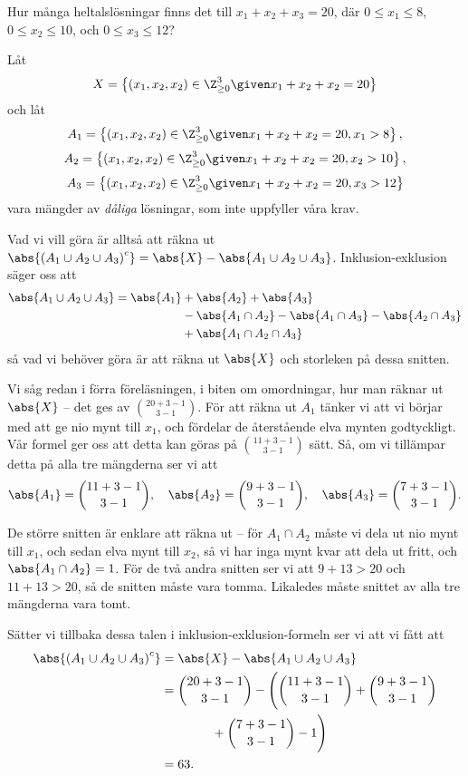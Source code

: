 \documentclass[nobib]{tufte-handout}
\begin{document}
\begin{example}
  Hur många heltalslösningar finns det till $x_1 + x_2 + x_3 = 20$, där $0 \leq x_1 \leq 8$, $0 \leq x_2 \leq 10$, och $0 \leq x_3 \leq 12$?

  Låt
  $$X = \left\{(x_1, x_2, x_2) \in \Z_{\geq 0}^3 \given x_1 + x_2 + x_2 = 20\right\}$$
  och låt
  $$A_1 = \left\{(x_1, x_2, x_2) \in \Z_{\geq 0}^3 \given x_1 + x_2 + x_2 = 20, x_1 > 8\right\},$$
  $$A_2 = \left\{(x_1, x_2, x_2) \in \Z_{\geq 0}^3 \given x_1 + x_2 + x_2 = 20, x_2 > 10\right\},$$
  $$A_3 = \left\{(x_1, x_2, x_2) \in \Z_{\geq 0}^3 \given x_1 + x_2 + x_2 = 20, x_3 > 12\right\}$$
  vara mängder av \emph{dåliga} lösningar, som inte uppfyller våra krav.

  Vad vi vill göra är alltså att räkna ut $\abs{\left(A_1 \cup A_2 \cup A_3\right)^c} = \abs{X} - \abs{A_1 \cup A_2 \cup A_3}$. 
  Inklusion-exklusion säger oss att
  \begin{align*}
    \abs{A_1 \cup A_2 \cup A_3} = \abs{A_1}& + \abs{A_2} + \abs{A_3}\\
    &- \abs{A_1 \cap A_2} - \abs{A_1 \cap A_3} - \abs{A_2 \cap A_3}\\
    &+ \abs{A_1 \cap A_2 \cap A_3}
  \end{align*}
  så vad vi behöver göra är att räkna ut $\abs{X}$ och storleken på dessa snitten.

  Vi såg redan i förra föreläsningen, i biten om omordningar, hur man räknar ut $\abs{X}$ -- det ges av $\binom{20+3-1}{3-1}$. För att räkna ut $A_1$ tänker vi att vi börjar med att ge nio mynt till $x_1$, och fördelar de återstående elva mynten godtyckligt. Vår formel ger oss att detta kan göras på $\binom{11+3-1}{3-1}$ sätt. Så, om vi tillämpar detta på alla tre mängderna ser vi att
  $$\abs{A_1} = \binom{11+3-1}{3-1}, \quad\abs{A_2} = \binom{9+3-1}{3-1}, \quad\abs{A_3} = \binom{7+3-1}{3-1}.$$

  De större snitten är enklare att räkna ut -- för $A_1\cap A_2$ måste vi dela ut nio mynt till $x_1$, och sedan elva mynt till $x_2$, så vi har inga mynt kvar att dela ut fritt, och $\abs{A_1 \cap A_2} = 1$. För de två andra snitten ser vi att $9 + 13 > 20$ och $11 + 13 > 20$, så de snitten måste vara tomma. Likaledes måste snittet av alla tre mängderna vara tomt.

  Sätter vi tillbaka dessa talen i inklusion-exklusion-formeln ser vi att vi fått att
  \begin{align*}
    \abs{\left(A_1 \cup A_2 \cup A_3\right)^c} &= \abs{X} - \abs{A_1 \cup A_2 \cup A_3}\\
    &= \binom{20 + 3 - 1}{3 - 1} - \Bigg(\binom{11+3-1}{3-1}+ \binom{9+3-1}{3-1}\\
    &\qquad\qquad + \binom{7+3-1}{3-1}- 1\Bigg)\\
    &= 63.
  \end{align*}
\end{example}
\end{document}

